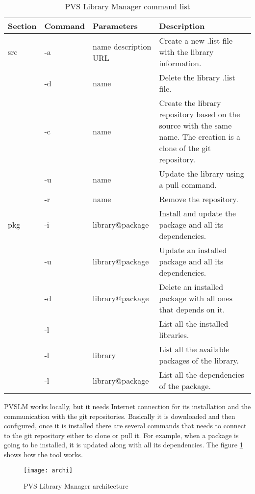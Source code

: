 \begin{table}[h!]
  \begin{center}
    \begin{tabular}{ | l | l | l | p{5cm} | }
      \hline Section & Command & Parameters & Description \\ \hline
      src & -a          & name description URL  & Create a new .list file with the library information.                   \\ \cline{2-4}
          & -d          & name                  & Delete the library .list file.                                          \\ \cline{2-4}
          & -c          & name                  & Create the library repository based on the source with the same name. 
                                                  The creation is a clone of the git repository.                          \\ \cline{2-4}
          & -u          & name                  & Update the library using a pull command.                                \\ \cline{2-4}
          & -r          & name                  & Remove the repository.                                                  \\ \hline
      pkg & -i          & library@package       & Install and update the package and all its dependencies.                \\ \cline{2-4}
          & -u          & library@package       & Update an installed package and all its dependencies.                   \\ \cline{2-4}
          & -d          & library@package       & Delete an installed package with all ones that depends on it.           \\ \cline{2-4}
          & -l          &                       & List all the installed libraries.                                       \\ \cline{2-4}
          & -l          & library               & List all the available packages of the library.                         \\ \cline{2-4}
          & -l          & library@package       & List all the dependencies of the package.                               \\ \hline
    \end{tabular}
  \end{center}
  \caption{PVS Library Manager command list}
  \label{tab:comm}
\end{table}

PVSLM works locally, but it needs Internet connection for its installation and the communication with the git repositories. Basically it is downloaded and then configured, once it is installed there are several commands that needs to connect to the git repository either to clone or pull it. For example, when a package is going to be installed, it is updated along with all its dependencies. The figure \ref{fig:archi} shows how the tool works.

\begin{figure}[h!]
  \centering
  \texttt{[image: archi]}
  \caption{PVS Library Manager architecture}
  \label{fig:archi}
\end{figure}

